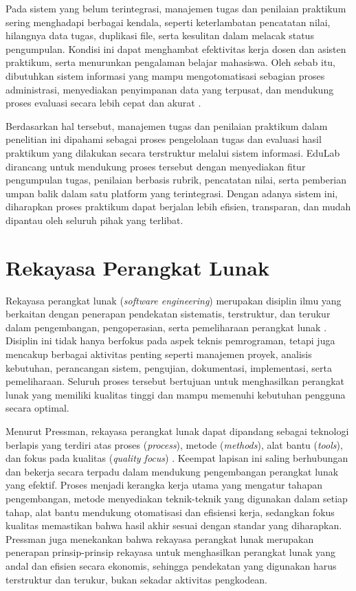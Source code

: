 \documentclass[12pt,a4paper,twoside]{report}
\begin{document}
Pada sistem yang belum terintegrasi, manajemen tugas dan penilaian praktikum sering menghadapi berbagai kendala, seperti keterlambatan pencatatan nilai, hilangnya data tugas, duplikasi file, serta kesulitan dalam melacak status pengumpulan. Kondisi ini dapat menghambat efektivitas kerja dosen dan asisten praktikum, serta menurunkan pengalaman belajar mahasiswa. Oleh sebab itu, dibutuhkan sistem informasi yang mampu mengotomatisasi sebagian proses administrasi, menyediakan penyimpanan data yang terpusat, dan mendukung proses evaluasi secara lebih cepat dan akurat \cite{bradley2021}.

Berdasarkan hal tersebut, manajemen tugas dan penilaian praktikum dalam penelitian ini dipahami sebagai proses pengelolaan tugas dan evaluasi hasil praktikum yang dilakukan secara terstruktur melalui sistem informasi. EduLab dirancang untuk mendukung proses tersebut dengan menyediakan fitur pengumpulan tugas, penilaian berbasis rubrik, pencatatan nilai, serta pemberian umpan balik dalam satu platform yang terintegrasi. Dengan adanya sistem ini, diharapkan proses praktikum dapat berjalan lebih efisien, transparan, dan mudah dipantau oleh seluruh pihak yang terlibat.
\section{Rekayasa Perangkat Lunak}

Rekayasa perangkat lunak (\textit{software engineering}) merupakan disiplin ilmu yang berkaitan dengan penerapan pendekatan sistematis, terstruktur, dan terukur dalam pengembangan, pengoperasian, serta pemeliharaan perangkat lunak \cite{sommerville2016}. Disiplin ini tidak hanya berfokus pada aspek teknis pemrograman, tetapi juga mencakup berbagai aktivitas penting seperti manajemen proyek, analisis kebutuhan, perancangan sistem, pengujian, dokumentasi, implementasi, serta pemeliharaan. Seluruh proses tersebut bertujuan untuk menghasilkan perangkat lunak yang memiliki kualitas tinggi dan mampu memenuhi kebutuhan pengguna secara optimal.

Menurut Pressman, rekayasa perangkat lunak dapat dipandang sebagai teknologi berlapis yang terdiri atas proses (\textit{process}), metode (\textit{methods}), alat bantu (\textit{tools}), dan fokus pada kualitas (\textit{quality focus}) \cite{pressman2014}. Keempat lapisan ini saling berhubungan dan bekerja secara terpadu dalam mendukung pengembangan perangkat lunak yang efektif. Proses menjadi kerangka kerja utama yang mengatur tahapan pengembangan, metode menyediakan teknik-teknik yang digunakan dalam setiap tahap, alat bantu mendukung otomatisasi dan efisiensi kerja, sedangkan fokus kualitas memastikan bahwa hasil akhir sesuai dengan standar yang diharapkan. Pressman juga menekankan bahwa rekayasa perangkat lunak merupakan penerapan prinsip-prinsip rekayasa untuk menghasilkan perangkat lunak yang andal dan efisien secara ekonomis, sehingga pendekatan yang digunakan harus terstruktur dan terukur, bukan sekadar aktivitas pengkodean.
\end{document}
